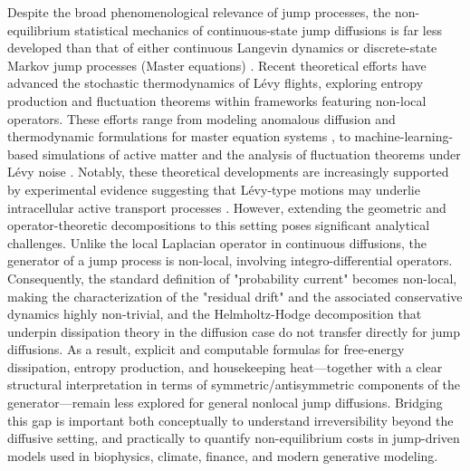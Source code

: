 \documentclass[10pt]{article}
\theoremstyle{definition}
\numberwithin{equation}{section}
\begin{document}
Despite the broad phenomenological relevance of jump processes, the non-equilibrium statistical mechanics of continuous-state jump diffusions is far less developed than that of either continuous Langevin dynamics or discrete-state Markov jump processes (Master equations) \cite{bremaud2020,MN03,MNW08,Schnakenberg76}. 
Recent theoretical efforts have advanced the stochastic thermodynamics of L\'{e}vy flights, exploring entropy production and fluctuation theorems within frameworks featuring non-local operators. These efforts range from modeling anomalous diffusion \cite{KRS2008} and thermodynamic formulations for master equation systems \cite{TD12}, to machine-learning-based simulations of active matter \cite{BV24} and the analysis of fluctuation theorems under L\'{e}vy noise \cite{HLMZ25}. Notably, these theoretical developments are increasingly supported by experimental evidence suggesting that L\'{e}vy-type motions may underlie intracellular active transport processes \cite{chen2015}.
However, extending the geometric and operator-theoretic decompositions to this setting poses significant analytical challenges.
Unlike the local Laplacian operator in continuous diffusions, the generator of a jump process is non-local, involving integro-differential operators.
Consequently, the standard definition of "probability current" becomes non-local, making the characterization of the "residual drift" and the associated conservative dynamics highly non-trivial, and the Helmholtz-Hodge decomposition that underpin dissipation theory in the diffusion case do not transfer directly for jump diffusions. As a result, explicit and computable formulas for free-energy dissipation, entropy production, and housekeeping heat---together with a clear structural interpretation in terms of symmetric/antisymmetric components of the generator---remain less explored for general nonlocal jump diffusions. 
Bridging this gap is important both conceptually to understand irreversibility beyond the diffusive setting, and practically to quantify non-equilibrium costs in jump-driven models used in biophysics, climate, finance, and modern generative modeling.
\end{document}
